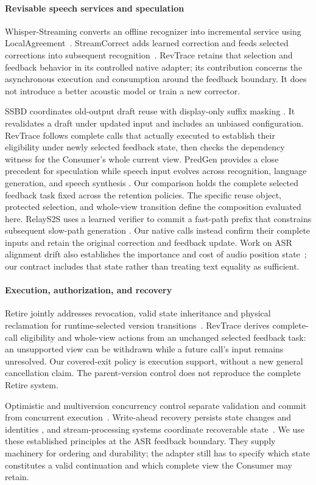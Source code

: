 \paragraph{Revisable speech services and speculation}
Whisper-Streaming converts an offline recognizer into incremental service
using LocalAgreement~\cite{machacek2023whisperstreaming}. StreamCorrect
adds learned correction and feeds selected corrections into subsequent
recognition~\cite{vu2026streamcorrect}. RevTrace retains that selection and
feedback behavior in its controlled native adapter; its contribution
concerns the asynchronous execution and consumption around the feedback
boundary. It does not introduce a better acoustic model or train a new
corrector.

SSBD coordinates old-output draft reuse with display-only suffix masking
\cite{zeng2026ssbd}. It revalidates a draft under updated input and includes
an unbiased configuration. RevTrace follows complete calls that actually
executed to establish their eligibility under newly selected feedback state,
then checks the dependency witness for the Consumer's whole current view.
PredGen provides a close precedent for speculation while speech input
evolves across recognition, language generation, and speech synthesis
\cite{li2025predgen}. Our comparison holds the complete selected feedback
task fixed across the retention policies. The specific reuse object,
protected selection, and whole-view transition define the composition
evaluated here. RelayS2S uses a learned verifier to commit a fast-path
prefix that constrains subsequent slow-path generation
\cite{mai2026relays2s}. Our native calls instead confirm their complete
inputs and retain the original correction and feedback update. Work on
ASR alignment drift also establishes the importance and cost of audio
position state~\cite{wang2026alignmentdrift}; our contract includes that
state rather than treating text equality as sufficient.

\paragraph{Execution, authorization, and recovery}
Retire jointly addresses revocation, valid state inheritance and physical
reclamation for runtime-selected version transitions~\cite{zhang2026retire}.
RevTrace derives complete-call eligibility and whole-view actions from
an unchanged selected feedback task: an unsupported view can be withdrawn
while a future call's input remains unresolved. Our covered-exit policy
is execution support, without a new general cancellation claim. The
parent-version control does not reproduce the complete Retire system.

Optimistic and multiversion concurrency control separate validation and
commit from concurrent execution~\cite{kung1981occ,bernstein1983mvcc}.
Write-ahead recovery persists state changes and identities
\cite{mohan1992aries}, and stream-processing systems coordinate recoverable
state~\cite{carbone2017flinkstate}. We use these established principles at
the ASR feedback boundary. They supply machinery for ordering and
durability; the adapter still has to specify which state constitutes a
valid continuation and which complete view the Consumer may retain.
